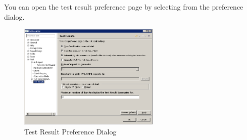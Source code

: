 
You can open the test result preference page by selecting  from the preference dialog. 

\begin{figure}[h]
\begin{center}
\includegraphics[width=0.6\textwidth]{Tasks/Preferences/PS/testresultprefs}
\caption{Test Result Preference Dialog}
\label{testresultprefs}
\end{center}
\end{figure}
